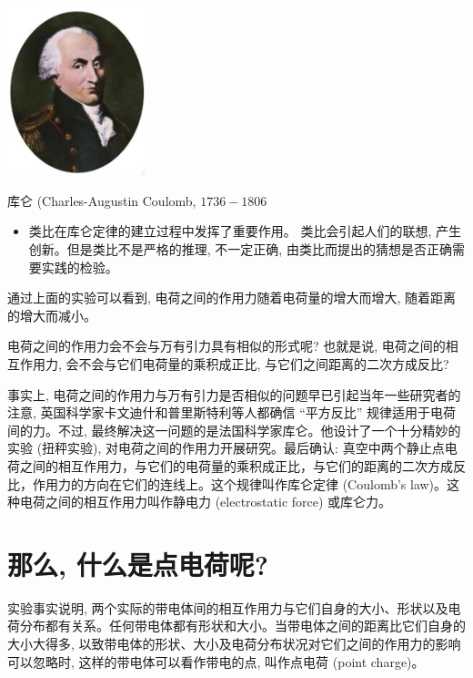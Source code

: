 \documentclass[10pt]{article}
\begin{document}
\begin{mdframed}

\begin{center}
\includegraphics[max width=0.3\textwidth]{images/01911d5f-8e38-70c0-b5b8-2b399bd115b6_11_252017.jpg}
\end{center}

库仑 (Charles-Augustin Coulomb, \({1736} - {1806}\)

\begin{itemize}
\item 类比在库仑定律的建立过程中发挥了重要作用。 类比会引起人们的联想, 产生创新。但是类比不是严格的推理, 不一定正确, 由类比而提出的猜想是否正确需要实践的检验。
\end{itemize}

\end{mdframed}

通过上面的实验可以看到, 电荷之间的作用力随着电荷量的增大而增大, 随着距离的增大而减小。

电荷之间的作用力会不会与万有引力具有相似的形式呢? 也就是说, 电荷之间的相互作用力, 会不会与它们电荷量的乘积成正比, 与它们之间距离的二次方成反比?

事实上, 电荷之间的作用力与万有引力是否相似的问题早已引起当年一些研究者的注意, 英国科学家卡文迪什和普里斯特利等人都确信 “平方反比” 规律适用于电荷间的力。不过, 最终解决这一问题的是法国科学家库仑。他设计了一个十分精妙的实验 (扭秤实验), 对电荷之间的作用力开展研究。最后确认: 真空中两个静止点电荷之间的相互作用力，与它们的电荷量的乘积成正比，与它们的距离的二次方成反比，作用力的方向在它们的连线上。这个规律叫作库仑定律 (Coulomb's law)。这种电荷之间的相互作用力叫作静电力 (electrostatic force) 或库仑力。

\section*{那么, 什么是点电荷呢?}

实验事实说明, 两个实际的带电体间的相互作用力与它们自身的大小、形状以及电荷分布都有关系。任何带电体都有形状和大小。当带电体之间的距离比它们自身的大小大得多, 以致带电体的形状、大小及电荷分布状况对它们之间的作用力的影响可以忽略时, 这样的带电体可以看作带电的点, 叫作点电荷 (point charge)。
\end{document}
